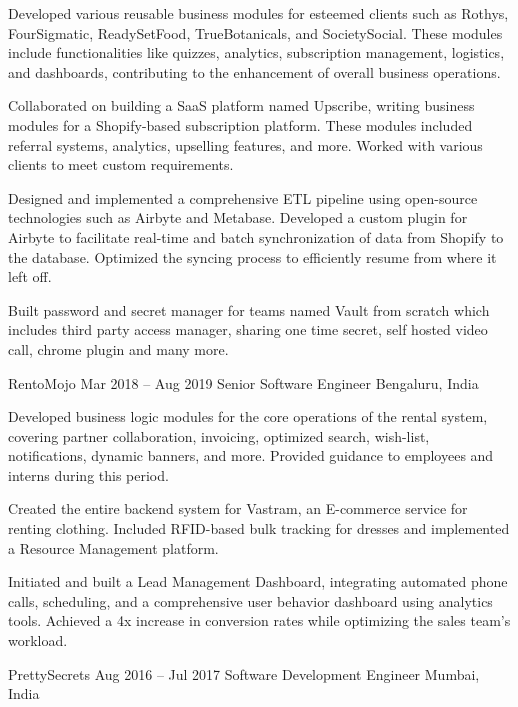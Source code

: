 \documentclass[12pt]{article}
\begin{document}
{{\begin{newitemize}
		\item {Developed various reusable business modules for esteemed clients such as Rothys, FourSigmatic, ReadySetFood, TrueBotanicals, and SocietySocial. These modules include functionalities like quizzes, analytics, subscription management, logistics, and dashboards, contributing to the enhancement of overall business operations.}
		\item {Collaborated on building a SaaS platform named Upscribe, writing business modules for a Shopify-based subscription platform. These modules included referral systems, analytics, upselling features, and more. Worked with various clients to meet custom requirements.}
		\item {Designed and implemented a comprehensive ETL pipeline using open-source technologies such as Airbyte and Metabase. Developed a custom plugin for Airbyte to facilitate real-time and batch synchronization of data from Shopify to the database. Optimized the syncing process to efficiently resume from where it left off.}
		\item {Built password and secret manager for teams named Vault from scratch which includes third party access manager, sharing one time secret, self hosted video call, chrome plugin and many more.}
		\end{newitemize}}

	\job
	{RentoMojo}
	{Mar 2018 – Aug 2019}
	{Senior Software Engineer}
	{Bengaluru, India}
	{\begin{newitemize}

		\item {Developed business logic modules for the core operations of the rental system, covering partner collaboration, invoicing, optimized search, wish-list, notifications, dynamic banners, and more. Provided guidance to employees and interns during this period.}
		\item {Created the entire backend system for Vastram, an E-commerce service for renting clothing. Included RFID-based bulk tracking for dresses and implemented a Resource Management platform.}
		\item {Initiated and built a Lead Management Dashboard, integrating automated phone calls, scheduling, and a comprehensive user behavior dashboard using analytics tools. Achieved a 4x increase in conversion rates while optimizing the sales team's workload.}	
	\end{newitemize}}

	\job
	{PrettySecrets}
	{Aug 2016 – Jul 2017}
	{Software Development Engineer}
	{Mumbai, India}
	{\begin{newitemize}


\end{newitemize}}}
\end{document}
